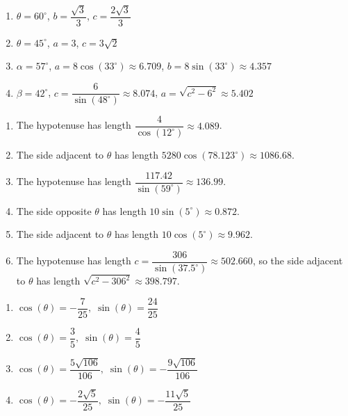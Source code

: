 \begin{enumerate}

\setcounter{enumi}{\value{HW}}

\item $\theta = 60^{\circ}$, $b = \dfrac{ \sqrt{3}}{3}$, $c=\dfrac{2 \sqrt{3}}{3}$

\item  $\theta = 45^{\circ}$, $a = 3$, $c = 3\sqrt{2}$

\item  $\alpha = 57^{\circ}$, $a = 8 \cos(33^{\circ}) \approx 6.709$, $b = 8 \sin(33^{\circ}) \approx 4.357$

\item  $\beta = 42^{\circ}$, $c = \dfrac{6}{\sin(48^{\circ})} \approx 8.074$, $a = \sqrt{c^2 - 6^2} \approx 5.402$

\setcounter{HW}{\value{enumi}}

\end{enumerate}


\begin{enumerate}

\setcounter{enumi}{\value{HW}}

\item The hypotenuse has length $\dfrac{4}{\cos(12^{\circ})}\approx 4.089$.
\item The side adjacent to $\theta$ has length $5280\cos(78.123^{\circ}) \approx 1086.68$.
\item The hypotenuse has length $\dfrac{117.42}{\sin(59^{\circ})}\approx 136.99$.
\item The side opposite $\theta$ has length $10\sin(5^{\circ}) \approx 0.872$.
\item The side adjacent to $\theta$ has length $10\cos(5^{\circ}) \approx 9.962$.
\item The hypotenuse has length $c = \dfrac{306}{\sin(37.5^{\circ})}\approx 502.660$, so the side adjacent to $\theta$ has length  $\sqrt{c^2 - 306^{2}} \approx 398.797$.

\setcounter{HW}{\value{enumi}}

\end{enumerate}

\begin{enumerate}

\setcounter{enumi}{\value{HW}}

\item $\cos(\theta) = -\dfrac{7}{25}, \; \sin(\theta) = \dfrac{24}{25}$

\item $\cos(\theta) = \dfrac{3}{5}, \; \sin(\theta) = \dfrac{4}{5}$

\item $\cos(\theta) = \dfrac{5\sqrt{106}}{106}, \; \sin(\theta) = -\dfrac{9\sqrt{106}}{106}$

\item $\cos(\theta) = -\dfrac{2\sqrt{5}}{25}, \; \sin(\theta) = -\dfrac{11\sqrt{5}}{25}$

\setcounter{HW}{\value{enumi}}

\end{enumerate}

